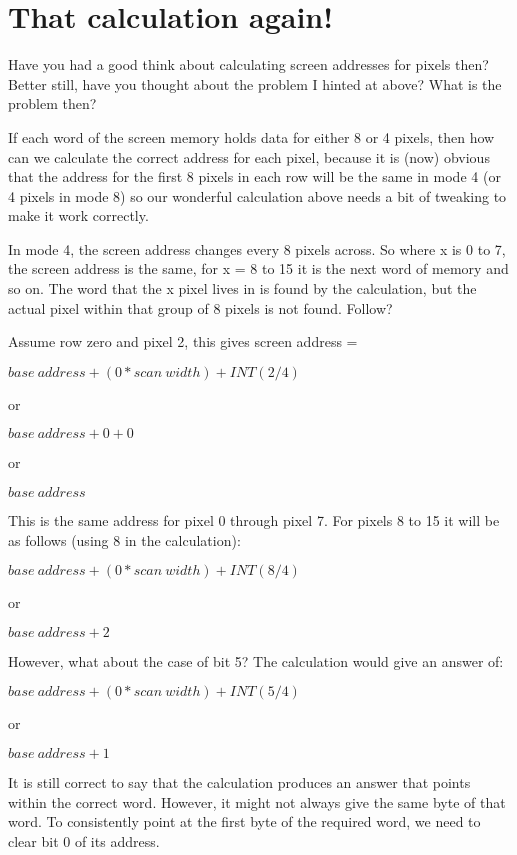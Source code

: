 \section{That calculation again!}
\label{ch8-calculation}%

Have you had a good think about calculating screen addresses for
    pixels then? Better still, have you thought about the problem I hinted at
    above? What is the problem then?

If each word of the screen memory holds data for either 8 or 4
    pixels, then how can we calculate the correct address for each pixel,
    because it is (now) obvious that the address for the first 8 pixels in
    each row will be the same in mode 4 (or 4 pixels in mode 8) so our
    wonderful calculation above needs a bit of tweaking to make it work
    correctly.

In mode 4, the screen address changes every 8 pixels across. So
    where x is 0 to 7, the screen address is the same, for x = 8 to 15 it is
    the next word of memory and so on. The word that the x pixel lives in is
    found by the calculation, but the actual pixel within that group of 8
    pixels is not found. Follow?

Assume row zero and pixel 2, this gives screen address =

$base~address + (0 * scan~width) + INT(2 / 4)$

or

$base~address + 0 + 0$

or

$base~address$

This is the same address for pixel 0 through pixel 7. For pixels 8
    to 15 it will be as follows (using 8 in the calculation):

$base~address + (0 * scan~width) + INT(8 / 4)$

or

$base~address + 2$

However, what about the case of bit 5? The calculation would give an answer of:

$base~address + (0 * scan~width) + INT(5 / 4)$

or

$base~address + 1$

It is still correct to say that the calculation produces an answer that points within the correct word. However, it might not always give the same byte of that word. To consistently point at the first byte of the required word, we need to clear bit 0 of its address. 

